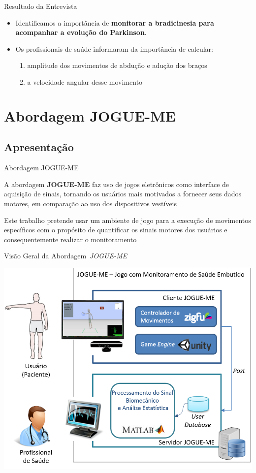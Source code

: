 \documentclass{beamer}
\begin{document}
\begin{frame}{Resultado da Entrevista} 
    \begin{block}{}
			\begin{itemize}
				\item Identificamos a importância de \textbf{monitorar a bradicinesia para acompanhar a evolução do Parkinson}.
				\item Os profissionais de saúde informaram da importância de calcular:
					\begin{enumerate}
						\item amplitude dos movimentos de abdução e adução dos braços
						\item a velocidade angular desse movimento
					\end{enumerate}
			\end{itemize}
    \end{block}
\end{frame} 

\section{Abordagem JOGUE-ME}
\subsection{Apresentação}
\begin{frame}{Abordagem JOGUE-ME}
    \begin{block}{}
    A abordagem \textbf{JOGUE-ME} faz uso de jogos eletrônicos como interface de aquisição de sinais, tornando os usuários mais motivados a fornecer seus dados motores, em comparação ao uso dos dispositivos vestíveis
    \end{block}
    
    
    \begin{block}{}
    Este trabalho pretende usar um ambiente de jogo para a execução de movimentos específicos com o propósito de quantificar os sinais motores dos usuários e consequentemente realizar o monitoramento
    \end{block}
\end{frame}

\begin{frame}{Visão Geral da Abordagem~\textit{JOGUE-ME}}
  \begin{block}{}
      \center \includegraphics[height=1.8 in]{img/visaosistema.png}
  \end{block}
\end{frame}
\end{document}
